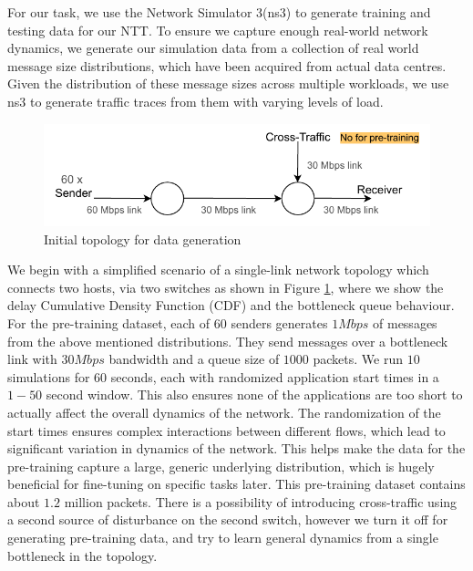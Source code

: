 For our task, we use the Network Simulator 3(ns3)\cite{ns3} to generate training and testing data for our NTT. To ensure we capture enough real-world network dynamics, we generate our simulation data from a collection of real world message size distributions, which have been acquired from actual data centres. Given the distribution of these message sizes across multiple workloads, we use ns3 to generate traffic traces from them with varying levels of load\cite{homa}.

\begin{figure}[h]
  \begin{center}
    \includegraphics[scale=1.2]{figures/simple_topo.pdf}
    \caption{Initial topology for data generation}
    \label{fig:topo}
  \end{center}
\end{figure}

We begin with a simplified scenario of a single-link network topology which connects two hosts, via two switches as shown in Figure \ref{fig:topo}, where we show the delay Cumulative Density Function (CDF) and the bottleneck queue behaviour. For the pre-training dataset, each of $60$ senders generates $1Mbps$ of messages from the above mentioned distributions. They send messages over a bottleneck link with $30Mbps$ bandwidth and a queue size of $1000$ packets. We run $10$ simulations for $60$ seconds, each with randomized application start times in a $1-50$ second window. This also ensures none of the applications are too short to actually affect the overall dynamics of the network. The randomization of the start times ensures complex interactions between different flows, which lead to significant variation in dynamics of the network. This helps make the data for the pre-training capture a large, generic underlying distribution, which is hugely beneficial for fine-tuning on specific tasks later. This pre-training dataset contains about $1.2$ million packets. There is a possibility of introducing cross-traffic using a second source of disturbance on the second switch, however we turn it off for generating pre-training data, and try to learn general dynamics from a single bottleneck in the topology.

